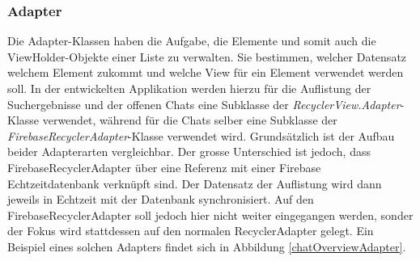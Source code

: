 \documentclass[../main.tex]{subfiles}
\begin{document}
	
	\subsubsection{Adapter}
	Die Adapter-Klassen haben die Aufgabe, die Elemente und somit auch die ViewHolder-Objekte einer Liste zu verwalten. Sie bestimmen, welcher Datensatz welchem Element zukommt und welche View für ein Element verwendet werden soll. In der entwickelten Applikation werden hierzu für die Auflistung der Suchergebnisse und der offenen Chats eine Subklasse der \emph{RecyclerView.Adapter}-Klasse verwendet, während für die Chats selber eine Subklasse der \emph{FirebaseRecyclerAdapter}-Klasse verwendet wird. Grundsätzlich ist der Aufbau beider Adapterarten vergleichbar. Der grosse Unterschied ist jedoch, dass FirebaseRecyclerAdapter über eine Referenz mit einer Firebase Echtzeitdatenbank verknüpft sind. Der Datensatz der Auflistung wird dann jeweils in Echtzeit mit der Datenbank synchronisiert. Auf den FirebaseRecyclerAdapter soll jedoch hier nicht weiter eingegangen werden, sonder der Fokus wird stattdessen auf den normalen RecyclerAdapter gelegt. Ein Beispiel eines solchen Adapters findet sich in Abbildung \ref{chatOverviewAdapter}.
	
\end{document}
